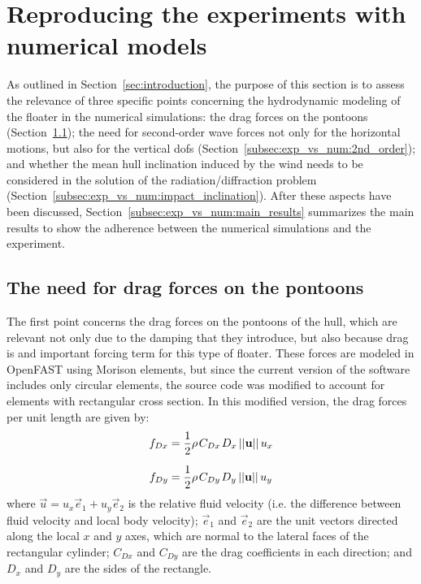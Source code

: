 \section{Reproducing the experiments with numerical models} \label{sec:exp_vs_num}
As outlined in Section~\ref{sec:introduction}, the purpose of this section is to assess the relevance of three specific points concerning the hydrodynamic modeling of the floater in the numerical simulations: the drag forces on the pontoons (Section~\ref{subsec:exp_vs_num:drag}); the need for second-order wave forces not only for the horizontal motions, but also for the vertical dofs (Section~\ref{subsec:exp_vs_num:2nd_order}); and whether the mean hull inclination induced by the wind needs to be considered in the solution of the radiation/diffraction problem (Section~\ref{subsec:exp_vs_num:impact_inclination}). After these aspects have been discussed, Section~\ref{subsec:exp_vs_num:main_results} summarizes the main results to show the adherence between the numerical simulations and the experiment.


\subsection{The need for drag forces on the pontoons} \label{subsec:exp_vs_num:drag}
The first point concerns the drag forces on the pontoons of the hull, which are relevant not only due to the damping that they introduce, but also because drag is and important forcing term for this type of floater. These forces are modeled in OpenFAST using Morison elements, but since the current version of the software includes only circular elements, the source code was modified to account for elements with rectangular cross section. In this modified version, the drag forces per unit length are given by:
\begin{equation}
\begin{split}
	f_{Dx} &= \frac{1}{2} \rho \mkern2mu C_{Dx} \mkern2mu D_x \,||\vec{u}|| \, u_x \\[6pt]
	f_{Dy} &= \frac{1}{2} \rho \mkern2mu C_{Dy} \mkern2mu D_y \,||\vec{u}|| \, u_y
\end{split}		
\end{equation}
%
where $\vec{u}=u_x\vec{e}_1+u_y\vec{e}_2$ is the relative fluid velocity (i.e. the difference between fluid velocity and local body velocity); $\vec{e}_1$ and $\vec{e}_2$ are the unit vectors directed along the local $x$ and $y$ axes, which are normal to the lateral faces of the rectangular cylinder; $C_{Dx}$ and $C_{Dy}$ are the drag coefficients in each direction; and $D_x$ and $D_y$ are the sides of the rectangle.

